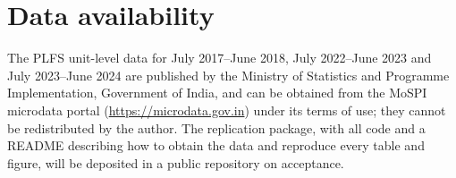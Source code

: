 \section*{Data availability}
The PLFS unit-level data for July 2017--June 2018, July 2022--June 2023 and July 2023--June 2024 are published by the Ministry of Statistics and Programme Implementation, Government of India, and can be obtained from the MoSPI microdata portal (\url{https://microdata.gov.in}) under its terms of use; they cannot be redistributed by the author. The replication package, with all code and a README describing how to obtain the data and reproduce every table and figure, will be deposited in a public repository on acceptance.

